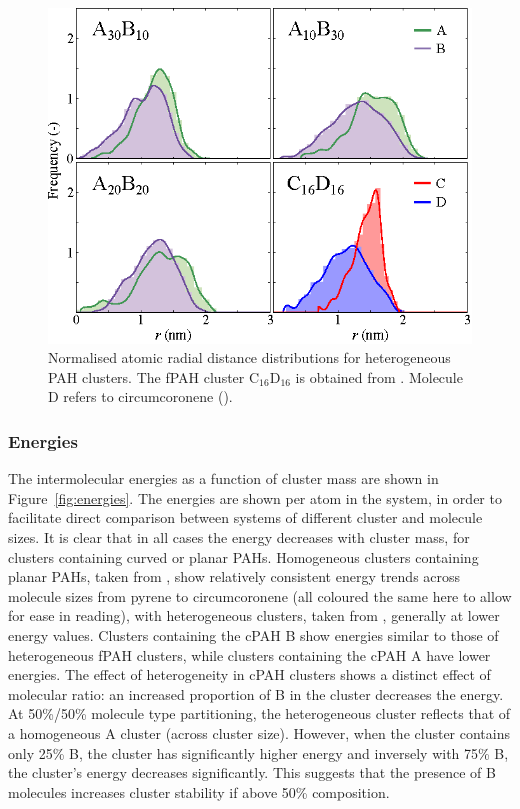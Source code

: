 %
\begin{figure}[!tbh]
\centering
\includegraphics[width=0.6\linewidth]{Figures/radii_histograms_aa.eps}
\caption{Normalised atomic radial distance distributions for heterogeneous PAH clusters. The fPAH cluster $\text{C}_{\text{16}}\text{D}_{\text{16}}$ is obtained from \citet{bowal2018partitioning}. Molecule D refers to circumcoronene ().}
\label{fig:radialdists_atomic}
\end{figure}
%

\subsubsection{Energies}
The intermolecular energies as a function of cluster mass are shown in Figure~\ref{fig:energies}.  The energies are shown per atom in the system, in order to facilitate direct comparison between systems of different cluster and molecule sizes. It is clear that in all cases the energy decreases with cluster mass, for clusters containing curved or planar PAHs. Homogeneous clusters containing planar PAHs, taken from \citet{chen2014size,chen2015solid}, show relatively consistent energy trends across molecule sizes from pyrene to circumcoronene (all coloured the same here to allow for ease in reading), with heterogeneous clusters, taken from \citet{bowal2018partitioning}, generally at lower energy values. Clusters containing the cPAH B show energies similar to those of heterogeneous fPAH clusters, while clusters containing the cPAH A have lower energies.
The effect of heterogeneity in cPAH clusters shows a distinct effect of molecular ratio: an increased proportion of B in the cluster decreases the energy. At 50\%/50\% molecule type partitioning, the heterogeneous cluster reflects that of a homogeneous A cluster (across cluster size). However, when the cluster contains only 25\% B, the cluster has significantly higher energy and inversely with 75\% B, the cluster's energy decreases significantly.  This suggests that the presence of B molecules increases cluster stability if above 50\% composition.


